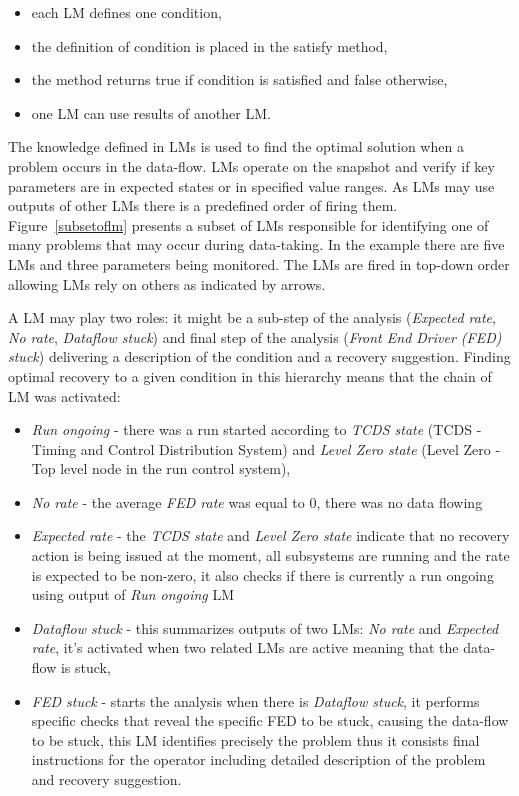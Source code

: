 \documentclass[a4paper]{jpconf}
\begin{document}
\begin{itemize}
\itemsep0em
\item each LM defines one condition,
\item the definition of condition is placed in the satisfy method,
\item the method returns true if condition is satisfied and false otherwise,
\item one LM can use results of another LM.
\end{itemize}

The knowledge defined in LMs is used to find the optimal solution when a problem occurs in the data-flow. LMs operate on the snapshot and verify if key parameters are in expected states or in specified value ranges. As LMs may use outputs of other LMs there is a predefined order of firing them. Figure~\ref{subsetoflm} presents a subset of LMs responsible for identifying one of many problems that may occur during data-taking. In the example there are five LMs and three parameters being monitored. The LMs are fired in top-down order allowing LMs rely on others as indicated by arrows.


A LM may play two roles: it might be a sub-step of the analysis ({\it Expected rate}, {\it No rate}, {\it Dataflow stuck}) and final step of the analysis ({\it Front End Driver (FED) stuck}) delivering a description of the condition and a recovery suggestion. Finding optimal recovery to a given condition in this hierarchy means that the chain of LM was activated:

\begin{itemize}
\item {\it Run ongoing} -  there was a run started according to{ \it TCDS state} (TCDS - Timing and Control Distribution System) and{ \it Level Zero state} (Level Zero - Top level node in the run control system),
\item{\it No rate} - the average {\it FED rate} was equal to 0, there was no data flowing
\item{\it Expected rate} - the {\it TCDS state}  and {\it Level Zero state} indicate that no recovery action is being issued at the moment, all subsystems are running and the rate is expected to be non-zero, it also checks if there is currently a run ongoing using output of {\it Run ongoing} LM
\item {\it Dataflow stuck} - this summarizes outputs of two LMs: {\it No rate} and {\it Expected rate}, it's activated when two related LMs are active meaning that the data-flow is stuck,
\item {\it FED stuck} - starts the analysis when there is {\it Dataflow stuck}, it performs specific checks that reveal the specific FED to be stuck, causing the data-flow to be stuck, this LM identifies precisely the problem thus it consists final instructions for the operator including detailed description of the problem and recovery suggestion.
\end{itemize}
\end{document}
